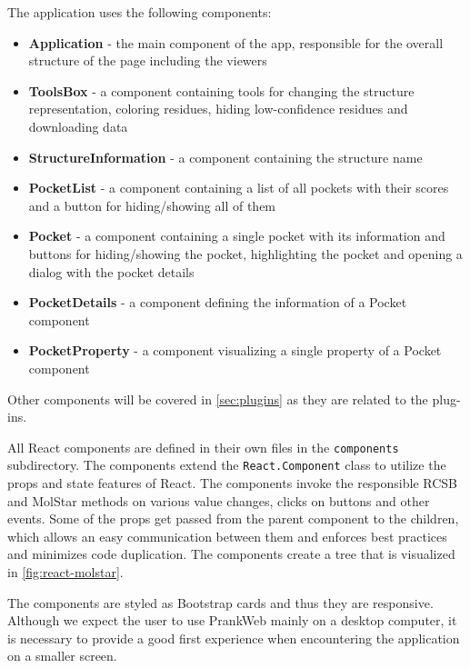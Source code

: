 The application uses the following components:

\begin{itemize}
    \item \textbf{Application} - the main component of the app, responsible for the overall structure of the page including the viewers
    \item \textbf{ToolsBox} - a component containing tools for changing the structure representation, coloring residues, hiding low-confidence residues and downloading data
    \item \textbf{StructureInformation} - a component containing the structure name
    \item \textbf{PocketList} - a component containing a list of all pockets with their scores and a button for hiding/showing all of them
    \item \textbf{Pocket} - a component containing a single pocket with its information and buttons for hiding/showing the pocket, highlighting the pocket and opening a dialog with the pocket details
    \item \textbf{PocketDetails} - a component defining the information of a Pocket component
    \item \textbf{PocketProperty} - a component visualizing a single property of a Pocket component
\end{itemize}

Other components will be covered in \cref{sec:plugins} as they are related to the plug-ins.

All React components are defined in their own files in the \texttt{components} subdirectory. The components extend the \texttt{React.Component} class to utilize the props and state features of React. The components invoke the responsible RCSB and MolStar methods on various value changes, clicks on buttons and other events. Some of the props get passed from the parent component to the children, which allows an easy communication between them and enforces best practices and minimizes code duplication. The components create a tree that is visualized in \cref{fig:react-molstar}.

The components are styled as Bootstrap cards and thus they are responsive. Although we expect the user to use PrankWeb mainly on a desktop computer, it is necessary to provide a good first experience when encountering the application on a smaller screen.


